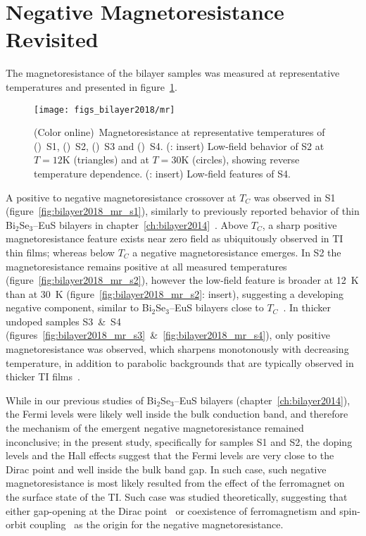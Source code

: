 \FloatBarrier%
\section{Negative Magnetoresistance Revisited}
The magnetoresistance of the bilayer samples was measured at representative temperatures and presented in figure~\ref{fig:bilayer2018_mr}. %
%
\begin{figure}[ht]%
    \centering%
    \texttt{[image: figs\_bilayer2018/mr]}%
    \subfloat{\label{fig:bilayer2018_mr_s1}}%
    \subfloat{\label{fig:bilayer2018_mr_s2}}%
    \subfloat{\label{fig:bilayer2018_mr_s3}}%
    \subfloat{\label{fig:bilayer2018_mr_s4}}%
    \caption[Magnetoresistance of (Bi$_{x}$Sb$_{1-x}$)$_2$Te$_3$--EuS bilayers]{\label{fig:bilayer2018_mr}(Color online)~Magnetoresistance at representative temperatures of (\protect{})~S1, (\protect{})~S2, (\protect{})~S3 and (\protect{})~S4. (\protect{}: insert) Low-field behavior of S2 at $T = 12\mathrm{K}$ (triangles) and at $T = 30\mathrm{K}$ (circles), showing reverse temperature dependence. (\protect{}: insert) Low-field features of S4.}%
\end{figure}%
%
A positive to negative magnetoresistance crossover at $T_C$ was observed in S1 (figure~\ref{fig:bilayer2018_mr_s1}), similarly to previously reported behavior of thin Bi$_2$Se$_3$--EuS bilayers in chapter~\ref{ch:bilayer2014}~\cite{bilayer2014}. Above $T_C$, a sharp positive magnetoresistance feature exists near zero field as ubiquitously observed in TI thin films; whereas below $T_C$ a negative magnetoresistance emerges. In S2 the magnetoresistance remains positive at all measured temperatures (figure~\ref{fig:bilayer2018_mr_s2}), however the low-field feature is broader at 12~K than at 30~K (figure~\ref{fig:bilayer2018_mr_s2}: insert), suggesting a developing negative component, similar to Bi$_2$Se$_3$--EuS bilayers close to $T_C$~\cite{bilayer2014}. In thicker undoped samples S3~\&~S4 (figures~\ref{fig:bilayer2018_mr_s3}~\&~\ref{fig:bilayer2018_mr_s4}), only positive magnetoresistance was observed, which sharpens monotonously with decreasing temperature, in addition to parabolic backgrounds that are typically observed in thicker TI films~\cite{TI_WAL_thickness}.

While in our previous studies of Bi$_2$Se$_3$--EuS bilayers (chapter~\ref{ch:bilayer2014}), the Fermi levels were likely well inside the bulk conduction band, and therefore the mechanism of the emergent negative magnetoresistance remained inconclusive; in the present study, specifically for samples S1 and S2, the doping levels and the Hall effects suggest that the Fermi levels are very close to the Dirac point and well inside the bulk band gap. In such case, such negative magnetoresistance is most likely resulted from the effect of the ferromagnet on the surface state of the TI. Such case was studied theoretically, suggesting that either gap-opening at the Dirac point~\cite{WL_Glazman, WL_WAL_competition} or coexistence of ferromagnetism and spin-orbit coupling~\cite{WL_ferromagnetism} as the origin for the negative magnetoresistance.

